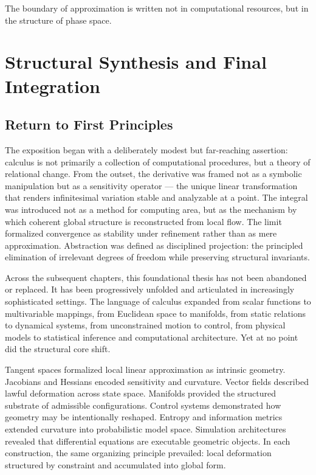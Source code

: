 \documentclass[12pt]{book}
\begin{document}
The boundary of approximation is written not in computational resources, but in the structure of phase space.

\chapter{Structural Synthesis and Final Integration}

\section{Return to First Principles}

The exposition began with a deliberately modest but far-reaching
assertion: calculus is not primarily a collection of computational
procedures, but a theory of relational change. From the outset, the
derivative was framed not as a symbolic manipulation but as a
sensitivity operator --- the unique linear transformation that renders
infinitesimal variation stable and analyzable at a point. The integral
was introduced not as a method for computing area, but as the
mechanism by which coherent global structure is reconstructed from
local flow. The limit formalized convergence as stability under
refinement rather than as mere approximation. Abstraction was defined
as disciplined projection: the principled elimination of irrelevant
degrees of freedom while preserving structural invariants.

Across the subsequent chapters, this foundational thesis has not been
abandoned or replaced. It has been progressively unfolded and
articulated in increasingly sophisticated settings. The language of
calculus expanded from scalar functions to multivariable mappings,
from Euclidean space to manifolds, from static relations to dynamical
systems, from unconstrained motion to control, from physical models
to statistical inference and computational architecture. Yet at no
point did the structural core shift.

Tangent spaces formalized local linear approximation as intrinsic
geometry. Jacobians and Hessians encoded sensitivity and curvature.
Vector fields described lawful deformation across state space.
Manifolds provided the structured substrate of admissible
configurations. Control systems demonstrated how geometry may be
intentionally reshaped. Entropy and information metrics extended
curvature into probabilistic model space. Simulation architectures
revealed that differential equations are executable geometric objects.
In each construction, the same organizing principle prevailed: local
deformation structured by constraint and accumulated into global form.
\end{document}
